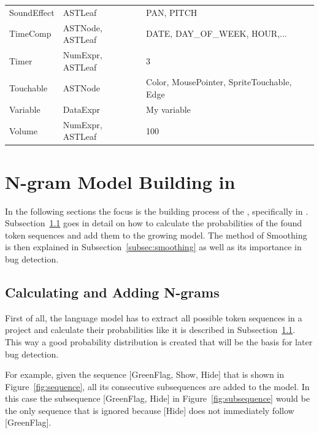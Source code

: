 \begin{table}[H]
\begin{tabular}[t]{lll}
    		SoundEffect & ASTLeaf & PAN, PITCH \\
    		\vspace{10pt}
    		TimeComp & ASTNode, ASTLeaf & DATE, DAY\_OF\_WEEK, HOUR,... \\
    		\vspace{10pt}
    		Timer & NumExpr, ASTLeaf & 3 \\
    		\vspace{10pt} 
    		Touchable & ASTNode & \parbox[t]{7cm}{Color, MousePointer, SpriteTouchable, Edge} \\
    		\vspace{10pt}
    		Variable & DataExpr & My variable \\ 
    		\vspace{10pt}
        Volume & NumExpr, ASTLeaf & 100 \\     
    \bottomrule
    \end{tabular}
\end{table}

\section{N-gram Model Building in \scratch{}}\label{sec:model}
In the following sections the focus is the building process of the \ngram{}, specifically in \scratch{}. Subsection~\ref{subsec:n-grams} goes in detail on how to calculate the probabilities of the found token sequences and add them to the growing model. The method of Smoothing is then explained in Subsection~\ref{subsec:smoothing} as well as its importance in bug detection.

\subsection{Calculating and Adding N-grams}\label{subsec:n-grams}
First of all, the language model has to extract all possible token sequences in a \scratch{} project and calculate their probabilities like it is described in Subsection~\ref{subsec:n-grams}. This way a good probability distribution is created that will be the basis for later bug detection. 

For example, given the sequence [GreenFlag, Show, Hide] that is shown in Figure~\ref{fig:sequence}, all its consecutive subsequences are added to the model. In this case the subsequence [GreenFlag, Hide] in Figure~\ref{fig:subsequence} would be the only sequence that is ignored because [Hide] does not immediately follow [GreenFlag]. 

